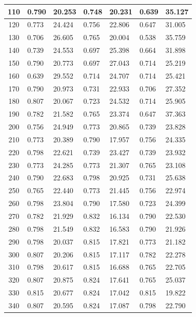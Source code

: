 \begin{longtable}{|c|l|l|l|l|l|l|}
        110 & 0.790 & 20.253 & 0.748 & 20.231 & 0.639 & 35.127 \\ \hline
        120 & 0.773 & 24.424 & 0.756 & 22.806 & 0.647 & 31.005 \\ \hline
        130 & 0.706 & 26.605 & 0.765 & 20.004 & 0.538 & 35.759 \\ \hline
        140 & 0.739 & 24.553 & 0.697 & 25.398 & 0.664 & 31.898 \\ \hline
        150 & 0.790 & 20.773 & 0.697 & 27.043 & 0.714 & 25.219 \\ \hline
        160 & 0.639 & 29.552 & 0.714 & 24.707 & 0.714 & 25.421 \\ \hline
        170 & 0.790 & 20.973 & 0.731 & 22.933 & 0.706 & 27.352 \\ \hline
        180 & 0.807 & 20.067 & 0.723 & 24.532 & 0.714 & 25.905 \\ \hline
        190 & 0.782 & 21.582 & 0.765 & 23.374 & 0.647 & 37.363 \\ \hline
        200 & 0.756 & 24.949 & 0.773 & 20.865 & 0.739 & 23.828 \\ \hline
        210 & 0.773 & 20.389 & 0.790 & 17.957 & 0.756 & 24.335 \\ \hline
        220 & 0.798 & 22.621 & 0.739 & 23.427 & 0.739 & 23.932 \\ \hline
        230 & 0.773 & 24.285 & 0.773 & 21.307 & 0.765 & 23.108 \\ \hline
        240 & 0.790 & 22.683 & 0.798 & 20.925 & 0.731 & 25.638 \\ \hline
        250 & 0.765 & 22.440 & 0.773 & 21.445 & 0.756 & 22.974 \\ \hline
        260 & 0.798 & 23.804 & 0.790 & 17.580 & 0.723 & 24.399 \\ \hline
        270 & 0.782 & 21.929 & 0.832 & 16.134 & 0.790 & 22.530 \\ \hline
        280 & 0.798 & 21.549 & 0.832 & 16.583 & 0.790 & 21.926 \\ \hline
        290 & 0.798 & 20.037 & 0.815 & 17.821 & 0.773 & 21.182 \\ \hline
        300 & 0.807 & 20.206 & 0.815 & 17.117 & 0.782 & 22.278 \\ \hline
        310 & 0.798 & 20.617 & 0.815 & 16.688 & 0.765 & 22.705 \\ \hline
        320 & 0.807 & 20.875 & 0.824 & 17.641 & 0.765 & 25.037 \\ \hline
        330 & 0.815 & 20.677 & 0.824 & 17.042 & 0.815 & 19.822 \\ \hline
        340 & 0.807 & 20.595 & 0.824 & 17.087 & 0.798 & 22.790 \\ \hline

\end{longtable}

